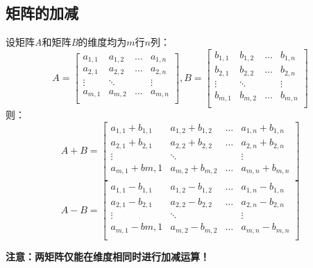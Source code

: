 \documentclass{ctexart}
\begin{document}
\subsection{矩阵的加减}
设矩阵\textit{A}和矩阵\textit{B}的维度均为$m$行$n$列：\[A=\begin{bmatrix}
a_{1,1} & a_{1,2} & \dots & a_{1,n}\\
a_{2,1} & a_{2,2} & \dots & a_{2,n}\\
\vdots & \ddots & &  \vdots\\
a_{m,1} & a_{m,2} & \dots & a_{m,n}\\
\end{bmatrix}, B=\begin{bmatrix}
b_{1,1} & b_{1,2} & \dots & b_{1,n}\\
b_{2,1} & b_{2,2} & \dots & b_{2,n}\\
\vdots & \ddots & &  \vdots\\
b_{m,1} & b_{m,2} & \dots & b_{m,n}\\
\end{bmatrix}\]
则：\[A+B = \begin{bmatrix}
a_{1,1}+b_{1,1} & a_{1,2}+b_{1,2} & \dots & a_{1,n}+b_{1,n}\\
a_{2,1}+b_{2,1} & a_{2,2}+b_{2,2} & \dots & a_{2,n}+b_{2,n}\\
\vdots & \ddots & &  \vdots\\
a_{m,1}+b{m,1} & a_{m,2}+b_{m,2} & \dots & a_{m,n}+b_{m,n}\\
\end{bmatrix}\]
\[A-B = \begin{bmatrix}
a_{1,1}-b_{1,1} & a_{1,2}-b_{1,2} & \dots & a_{1,n}-b_{1,n}\\
a_{2,1}-b_{2,1} & a_{2,2}-b_{2,2} & \dots & a_{2,n}-b_{2,n}\\
\vdots & \ddots & &  \vdots\\
a_{m,1}-b{m,1} & a_{m,2}-b_{m,2} & \dots & a_{m,n}-b_{m,n}\\
\end{bmatrix}\]
\par
\textbf{注意：两矩阵仅能在维度相同时进行加减运算！}
\end{document}
